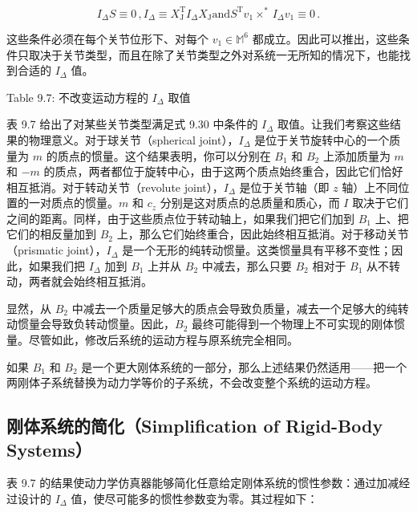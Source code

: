 \documentclass[10pt,a4paper]{book}
\theoremstyle{thmstyle} %
\theoremstyle{defstyle} %
\theoremstyle{prostyle} %
\begin{document}
$$
I _ { \Delta } S \equiv 0 \, ,  I _ { \Delta } \equiv X _ { \mathrm { J } } ^{\mathrm { T} } I _ { \Delta } X _ { \mathrm { J } }  \mathrm { a n d }  S ^{\mathrm { T} } v _ { 1 } { \times } ^{*} \, I _ { \Delta } v _ { 1 } \equiv 0 \, .
$$



这些条件必须在每个关节位形下、对每个 $v_1 \in \mathbb{M}^6$ 都成立。因此可以推出，这些条件只取决于关节类型，而且在除了关节类型之外对系统一无所知的情况下，也能找到合适的 $I_\Delta$ 值。



Table 9.7: 不改变运动方程的 $I_{\Delta}$ 取值





表 9.7 给出了对某些关节类型满足式 9.30 中条件的 $I_{\Delta}$ 取值。让我们考察这些结果的物理意义。对于球关节（spherical joint），$I_{\Delta}$ 是位于关节旋转中心的一个质量为 $m$ 的质点的惯量。这个结果表明，你可以分别在 $B_{1}$ 和 $B_{2}$ 上添加质量为 $m$ 和 $-m$ 的质点，两者都位于旋转中心，由于这两个质点始终重合，因此它们恰好相互抵消。对于转动关节（revolute joint），$I_{\Delta}$ 是位于关节轴（即 $z$ 轴）上不同位置的一对质点的惯量。$m$ 和 $c_{z}$ 分别是这对质点的总质量和质心，而 $I$ 取决于它们之间的距离。同样，由于这些质点位于转动轴上，如果我们把它们加到 $B_{1}$ 上、把它们的相反量加到 $B_{2}$ 上，那么它们始终重合，因此始终相互抵消。对于移动关节（prismatic joint），$I_{\Delta}$ 是一个无形的纯转动惯量。这类惯量具有平移不变性；因此，如果我们把 $I_{\Delta}$ 加到 $B_{1}$ 上并从 $B_{2}$ 中减去，那么只要 $B_{2}$ 相对于 $B_{1}$ 从不转动，两者就会始终相互抵消。



显然，从 $B_{2}$ 中减去一个质量足够大的质点会导致负质量，减去一个足够大的纯转动惯量会导致负转动惯量。因此，$B_{2}$ 最终可能得到一个物理上不可实现的刚体惯量。尽管如此，修改后系统的运动方程与原系统完全相同。



如果 $B_{1}$ 和 $B_{2}$ 是一个更大刚体系统的一部分，那么上述结果仍然适用——把一个两刚体子系统替换为动力学等价的子系统，不会改变整个系统的运动方程。



\subsection{刚体系统的简化（Simplification of Rigid-Body Systems）}





表 9.7 的结果使动力学仿真器能够简化任意给定刚体系统的惯性参数：通过加减经过设计的 $I_{\Delta}$ 值，使尽可能多的惯性参数变为零。其过程如下：
\end{document}
